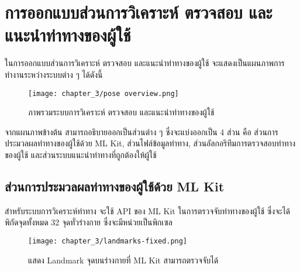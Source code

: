\section{การออกแบบส่วนการวิเคราะห์ ตรวจสอบ และแนะนำท่าทางของผู้ใช้}
ในการออกแบบส่วนการวิเคราะห์ ตรวจสอบ และแนะนำท่าทางของผู้ใช้ จะแสดงเป็นแผนภาพการทำงานระหว่างระบบต่าง ๆ ได้ดังนี้
\begin{figure}
    \texttt{[image: chapter\_3/pose overview.png]}
    \caption{ภาพรวมระบบการวิเคราะห์ ตรวจสอบ และแนะนำท่าทางของผู้ใช้}
\end{figure}
จากแผนภาพข้างต้น สามารถอธิบายออกเป็นส่วนต่าง ๆ ซึ่งจะแบ่งออกเป็น 4 ส่วน คือ ส่วนการประมวลผลท่าทางของผู้ใช้ด้วย ML Kit, ส่วนไฟล์ข้อมูลท่าทาง, ส่วนอัลกอริทึมการตรวจสอบท่าทางของผู้ใช้ และส่วนระบบแนะนำท่าทางที่ถูกต้องให้ผู้ใช้

\subsection{ส่วนการประมวลผลท่าทางของผู้ใช้ด้วย ML Kit}
สำหรับระบบการวิเคราะห์ท่าทาง จะใช้ API ของ ML Kit ในการตรวจจับท่าทางของผู้ใช้ ซึ่งจะได้พิกัดจุดทั้งหมด 32 จุดทั่วร่างกาย ซึ่งจะมีหน่วยเป็นพิกเซล
\begin{figure}
    \texttt{[image: chapter\_3/landmarks-fixed.png]}
    \caption{แสดง Landmark จุดบนร่างกายที่ ML Kit สามารถตรวจจับได้}
\end{figure}

